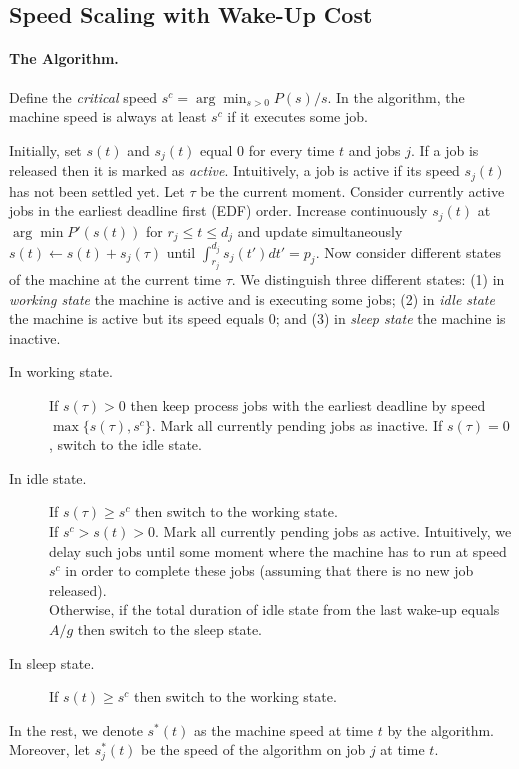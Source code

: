 \documentclass[11pt]{article}
\begin{document}
\subsection{Speed Scaling with Wake-Up Cost}

\paragraph{The Algorithm.}
Define the \emph{critical} speed $s^{c} = \arg \min_{s > 0} P(s)/s$.
In the algorithm, the machine speed is always at least $s^{c}$ if it executes some job.
 
Initially, set $s(t)$ and $s_{j}(t)$ equal 0 for every time $t$ and jobs $j$.
If a job is released then it is marked as \emph{active}. Intuitively, a job is active 
if its speed $s_{j}(t)$ has not been settled yet. 
Let $\tau$ be the current moment. Consider currently active jobs in the earliest deadline 
first (EDF) order. Increase continuously $s_{j}(t)$ at $\arg \min P'(s(t))$ for $r_{j} \leq t \leq d_{j}$
and update simultaneously $s(t) \gets s(t) + s_{j}(\tau)$ until $\int_{r_{j}}^{d_{j}} s_{j}(t')dt' = p_{j}$.
Now consider different states of the machine at the current time $\tau$. We distinguish 
three different states: (1) in \emph{working state} the machine is active and 
is executing some jobs; (2) in \emph{idle state} the machine is active but 
its speed equals 0; and (3) in \emph{sleep state} the machine is inactive.   
\begin{description}
	\item[In working state.] If $s(\tau) > 0$ then keep 
	process jobs with the earliest deadline by speed $\max\{s(\tau),s^{c}\}$. 
	Mark all currently pending jobs as inactive.
	If $s(\tau) = 0$, switch to the idle state.
\item[In idle state.] If $s(\tau) \geq s^{c}$ then switch to the working state. \\
	If $s^{c} > s(t) > 0$. Mark all currently pending jobs as active. 
	Intuitively, we delay such jobs until some moment where the machine has to run
	at speed $s^{c}$ in order to complete these jobs (assuming that there is no new job released).\\
	Otherwise, if the total duration of idle state from the last wake-up equals $A/g$ then switch 
	to the sleep state.
\item[In sleep state.] If $s(t) \geq s^{c}$ then switch to the working state.
\end{description}

In the rest, we denote $s^{*}(t)$ as the machine speed at time $t$
by the algorithm. Moreover, let $s^{*}_{j}(t)$ be the speed of the algorithm
on job $j$ at time $t$. 
\end{document}
